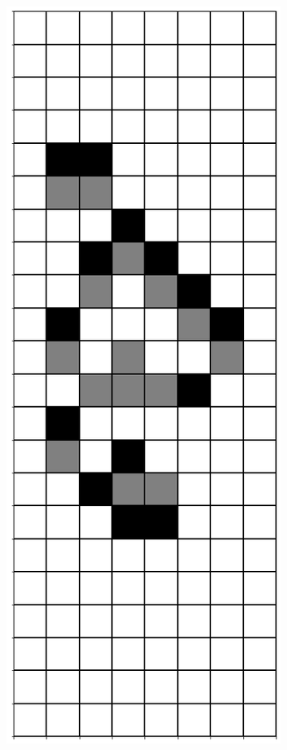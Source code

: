 \documentclass[12pt]{article}
\numberwithin{figure}{section} %
\begin{document}
\begin{figure}[H]
\begin{subfigure}{0.19\textwidth}
     \subcaption{}
   \end{subfigure}
   \newline
    \begin{subfigure}{0.19\textwidth}
     \centering
     \includegraphics[width=\linewidth]{Section4/28.5}

\end{subfigure}
\end{figure}
\end{document}
